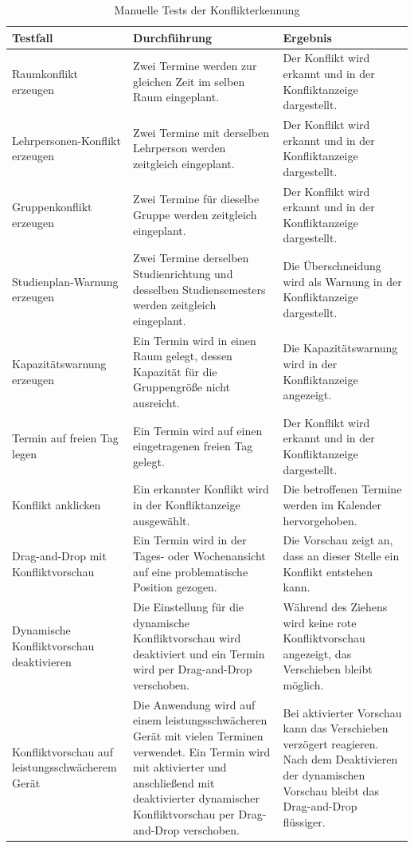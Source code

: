 \documentclass[12pt,a4paper]{article}
\begin{document}
\begin{table}[H]
\centering
\small
\caption{Manuelle Tests der Konflikterkennung}
\label{tab:test-konflikte}
\begin{tabularx}{\textwidth}{|L{3cm}|Y|Y|}
\hline
\textbf{Testfall} & \textbf{Durchführung} & \textbf{Ergebnis} \\
\hline
Raumkonflikt erzeugen & Zwei Termine werden zur gleichen Zeit im selben Raum eingeplant. & Der Konflikt wird erkannt und in der Konfliktanzeige dargestellt. \\
\hline
Lehrpersonen-Konflikt erzeugen & Zwei Termine mit derselben Lehrperson werden zeitgleich eingeplant. & Der Konflikt wird erkannt und in der Konfliktanzeige dargestellt. \\
\hline
Gruppenkonflikt erzeugen & Zwei Termine für dieselbe Gruppe werden zeitgleich eingeplant. & Der Konflikt wird erkannt und in der Konfliktanzeige dargestellt. \\
\hline
Studienplan-Warnung erzeugen & Zwei Termine derselben Studienrichtung und desselben Studiensemesters werden zeitgleich eingeplant. & Die Überschneidung wird als Warnung in der Konfliktanzeige dargestellt. \\
\hline
Kapazitäts\-warnung erzeugen & Ein Termin wird in einen Raum gelegt, dessen Kapazität für die Gruppengröße nicht ausreicht. & Die Kapazitätswarnung wird in der Konfliktanzeige angezeigt. \\
\hline
Termin auf freien Tag legen & Ein Termin wird auf einen eingetragenen freien Tag gelegt. & Der Konflikt wird erkannt und in der Konfliktanzeige dargestellt. \\
\hline
Konflikt anklicken & Ein erkannter Konflikt wird in der Konfliktanzeige ausgewählt. & Die betroffenen Termine werden im Kalender hervorgehoben. \\
\hline
Drag-and-Drop mit Konfliktvorschau & Ein Termin wird in der Tages- oder Wochenansicht auf eine problematische Position gezogen. & Die Vorschau zeigt an, dass an dieser Stelle ein Konflikt entstehen kann. \\
\hline
Dynamische Konfliktvorschau deaktivieren & Die Einstellung für die dynamische Konfliktvorschau wird deaktiviert und ein Termin wird per Drag-and-Drop verschoben. & Während des Ziehens wird keine rote Konfliktvorschau angezeigt, das Verschieben bleibt möglich. \\
\hline
Konfliktvorschau auf leistungsschwächerem Gerät & Die Anwendung wird auf einem leistungsschwächeren Gerät mit vielen Terminen verwendet. Ein Termin wird mit aktivierter und anschließend mit deaktivierter dynamischer Konfliktvorschau per Drag-and-Drop verschoben. & Bei aktivierter Vorschau kann das Verschieben verzögert reagieren. Nach dem Deaktivieren der dynamischen Vorschau bleibt das Drag-and-Drop flüssiger. \\
\hline
\end{tabularx}
\end{table}
\end{document}
